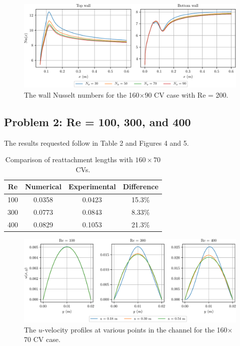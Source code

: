 \documentclass{article}
\begin{document}
\begin{figure}[H]
	\centering
	\includegraphics[width=0.9\linewidth]{../results/1c_Nu}
	\caption{The wall Nusselt numbers for the 160$\times$90 CV case with Re = 200.}
	\label{fig:1c_Nu}
\end{figure}

\subsection{Problem 2: Re = 100, 300, and 400}

The results requested follow in Table 2 and Figures 4 and 5.

\def\arraystretch{1.3}
\begin{table}[H]
	\small
	\centering
	\caption{Comparison of reattachment lengths with $160 \times 70$ CVs.}
	\vspace{0.2cm}
	\begin{tabular}{c|c|c|c}
		Re & Numerical & Experimental & Difference \\
		\hline
		100 & 0.0358 & 0.0423 & 15.3\% \\
		300 & 0.0773 & 0.0843 & 8.33\% \\
		400 & 0.0829 & 0.1053 & 21.3\% \\
	\end{tabular}
	\label{table:b-temps}
\end{table}

\begin{figure}[H]
	\centering
	\includegraphics[width=0.9\linewidth]{../results/2_u}
	\caption{The $u$-velocity profiles at various points in the channel for the 160$\times$70 CV case.}
	\label{fig:2_u}
\end{figure}
\end{document}
